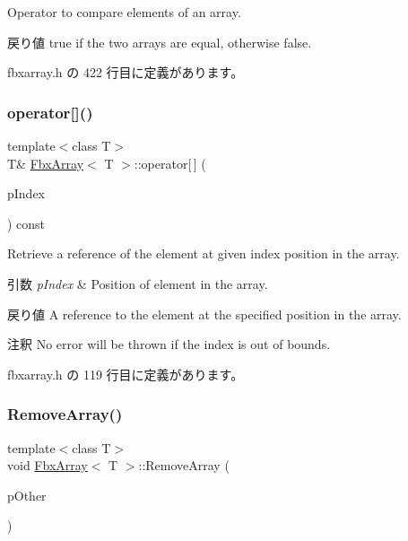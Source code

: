 Operator to compare elements of an array. \begin{DoxyReturn}{戻り値}
{\ttfamily true} if the two arrays are equal, otherwise {\ttfamily false}. 
\end{DoxyReturn}


 fbxarray.\+h の 422 行目に定義があります。

\mbox{\label{class_fbx_array_a163616f4c5bedff84cb6f7f1f8471eb8}} 
\subsubsection{\texorpdfstring{operator[]()}{operator[]()}}
{\footnotesize\ttfamily template$<$class T$>$ \\
T\& \hyperlink{class_fbx_array}{Fbx\+Array}$<$ T $>$\+::operator\mbox{[}$\,$\mbox{]} (\begin{DoxyParamCaption}\item[{const int}]{p\+Index }\end{DoxyParamCaption}) const\hspace{0.3cm}{\ttfamily [inline]}}

Retrieve a reference of the element at given index position in the array. 
\begin{DoxyParams}{引数}
{\em p\+Index} & Position of element in the array. \\
\hline
\end{DoxyParams}
\begin{DoxyReturn}{戻り値}
A reference to the element at the specified position in the array. 
\end{DoxyReturn}
\begin{DoxyRemark}{注釈}
No error will be thrown if the index is out of bounds. 
\end{DoxyRemark}


 fbxarray.\+h の 119 行目に定義があります。

\mbox{\label{class_fbx_array_a3884ec0b5b7eacf3fd636f9dfd77e619}} 
\subsubsection{\texorpdfstring{Remove\+Array()}{RemoveArray()}}
{\footnotesize\ttfamily template$<$class T$>$ \\
void \hyperlink{class_fbx_array}{Fbx\+Array}$<$ T $>$\+::Remove\+Array (\begin{DoxyParamCaption}\item[{const \hyperlink{class_fbx_array}{Fbx\+Array}$<$ T $>$ \&}]{p\+Other }\end{DoxyParamCaption})\hspace{0.3cm}{\ttfamily [inline]}}

